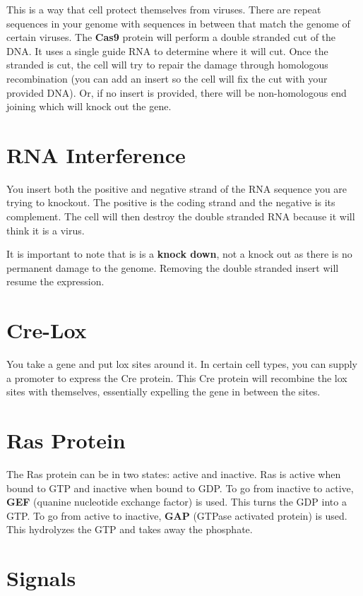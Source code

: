 \documentclass{article}
\begin{document}
This is a way that cell protect themselves from viruses. There are repeat
sequences in your genome with sequences in between that match the genome of
certain viruses. The \textbf{Cas9} protein will perform a double stranded cut of
the DNA. It uses a single guide RNA to determine where it will cut. Once the
stranded is cut, the cell will try to repair the damage through homologous
recombination (you can add an insert so the cell will fix the cut with your
provided DNA). Or, if no insert is provided, there will be non-homologous end
joining which will knock out the gene.

\section{RNA Interference}

You insert both the positive and negative strand of the RNA sequence you are
trying to knockout. The positive is the coding strand and the negative is its
complement. The cell will then destroy the double stranded RNA because it will
think it is a virus.

It is important to note that is is a \textbf{knock down}, not a knock out as
there is no permanent damage to the genome. Removing the double stranded insert
will resume the expression.

\section{Cre-Lox}

You take a gene and put lox sites around it. In certain cell types, you can
supply a promoter to express the Cre protein. This Cre protein will recombine
the lox sites with themselves, essentially expelling the gene in between the
sites.

\section{Ras Protein}

The Ras protein can be in two states: active and inactive. Ras is active when
bound to GTP and inactive when bound to GDP. To go from inactive to active,
\textbf{GEF} (quanine nucleotide exchange factor) is used. This turns the GDP
into a GTP. To go from active to inactive, \textbf{GAP} (GTPase activated
protein) is used. This hydrolyzes the GTP and takes away the phosphate.

\section{Signals}
\end{document}
